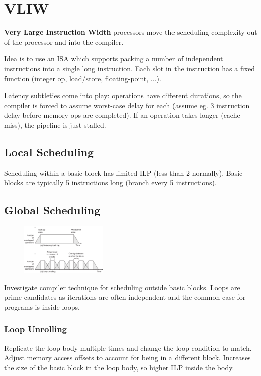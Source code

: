 \documentclass[11pt]{article}
\begin{document}
\section*{VLIW}
{
    \textbf{Very Large Instruction Width} processors move the scheduling complexity out of the processor and into the compiler.

    Idea is to use an ISA which supports packing a number of independent instructions into a single long instruction. Each slot in the instruction has a fixed function (integer op, load/store, floating-point, ...).

    Latency subtleties come into play: operations have different durations, so the compiler is forced to assume worst-case delay for each (assume eg. 3 instruction delay before memory ops are completed). If an operation takes longer (cache miss), the pipeline is just stalled.

    \subsection*{Local Scheduling}
    {
        Scheduling within a basic block has limited ILP (less than 2 normally). Basic blocks are typically 5 instructions long (branch every 5 instructions).
    }
    \subsection*{Global Scheduling}
    {
        \begin{figure}
        \centering
        \includegraphics[width=0.37\textwidth]{software-pipelining.png}
        \end{figure}

        Investigate compiler technique for scheduling outside basic blocks. Loops are prime candidates as iterations are often independent and the common-case for programs is inside loops.

        \subsubsection*{Loop Unrolling}
        {
            Replicate the loop body multiple times and change the loop condition to match. Adjust memory access offsets to account for being in a different block. Increases the size of the basic block in the loop body, so higher ILP inside the body.

}}}
\end{document}
